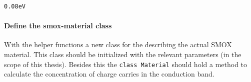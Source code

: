 \documentclass[11pt]{article}
\begin{document}
    \begin{Verbatim}[commandchars=\\\{\}]
0.08eV
    \end{Verbatim}

    \hypertarget{define-the-smox-material-class}{%
\paragraph{Define the smox-material
class}\label{define-the-smox-material-class}}

With the helper functions a new class for the describing the actual SMOX
material. This class should be initialized with the relevant parameters
(in the scope of this thesis). Besides this the \texttt{class\ Material}
should hold a method to calculate the concentration of charge carries in
the conduction band.
\end{document}
